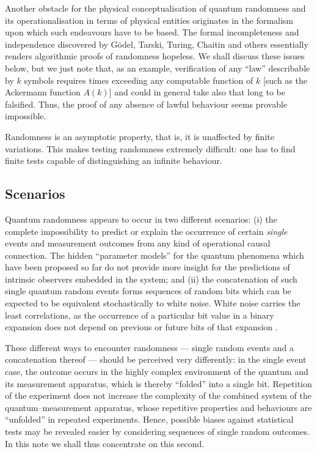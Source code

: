 \documentclass[pra,amsfonts,preprint,showkeys]{revtex4}
\begin{document}
Another obstacle for the physical conceptualisation of quantum randomness
and its operationalisation in terms of physical entities
originates in the formalism upon which such
endeavours have to be based.
The formal incompleteness and independence
discovered by G\"odel, Tarski, Turing, Chaitin and others essentially renders
algorithmic proofs of randomness hopeless. We shall discuss these issues below,
but we just note that, as an example, verification of
any ``law'' describable by $k$ symbols requires times exceeding any computable
 function  of $k$ [such as the Ackermann function $A(k)$]
and could in general take also that long to be falsified.
Thus, the proof of any absence of lawful behaviour seems  provable impossible.


Randomness is an asymptotic property, that is,  it is unaffected by finite variations. This makes testing randomness extremely difficult: one has to find finite tests capable of distinguishing an infinite behaviour.



\subsection{Scenarios}

 Quantum randomness appears to occur in two different scenarios:
(i) the complete impossibility to predict or explain the occurrence of certain
{\em single} events and measurement outcomes from any kind
of operational causal connection. The hidden ``parameter models'' for the quantum phenomena which
have been proposed so far do not provide more insight for the predictions
of intrinsic observers embedded in the system;
and
(ii) the concatenation of such single quantum random events forms sequences of random bits
which can be expected to be equivalent stochastically to  white noise.
White noise carries the least correlations, as the occurrence of a particular bit value
in a binary expansion does not depend on previous or future bits of that expansion
\cite{gard-78}.

These different ways to encounter randomness ---
single random events and a concatenation thereof ---
should be perceived very differently:
in the single event case, the outcome occurs in the highly complex
environment of the quantum and its measurement apparatus, which is thereby
``folded'' into a single bit.
Repetition of the experiment does not increase
the complexity of the combined system of the quantum--measurement apparatus,
whose
repetitive
properties and behaviours are ``unfolded'' in repeated experiments.
Hence, possible biases against statistical tests may be revealed easier by considering sequences of single random outcomes.
In this note we shall thus concentrate on this second.
\end{document}
